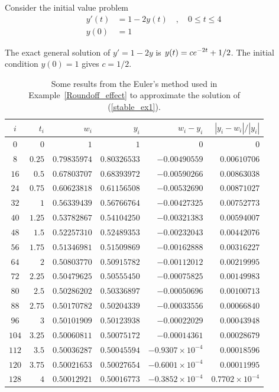 \begin{egg}
Consider the initial value problem
\begin{equation} \label{stable_ex1}
\begin{split}
y'(t) &= 1 -2y(t) \quad , \quad 0\leq t \leq 4 \\
y(0) &= 1
\end{split}
\end{equation}

The exact general solution of $y'= 1-2y$ is
$\displaystyle y(t) = c e^{-2t} +1/2$.
The initial condition $y(0)=1$ gives $c = 1/2$.

\begin{table}
\begin{center}
{\small
\begin{tabular}{crrrrr}
$i$ & $t_i$ & $w_i$ & $y_i$ & $w_i-y_i$ & $|y_i-w_i|/|y_i|$ \\
\hline
$0$ & $0$ & $1$ & $1$ & $0$ & $0$ \\
$8$ & $0.25$ & $0.79835974$ & $0.80326533$ & $-0.00490559$ & $0.00610706$\\
$16$ & $0.5$ & $0.67803707$ & $0.68393972$ & $-0.00590266$ & $0.00863038$ \\
$24$ & $0.75$ & $0.60623818$ & $0.61156508$ & $-0.00532690$ & $0.00871027$ \\
$32$ & $1$ & $0.56339439$ & $0.56766764$ & $-0.00427325$ & $0.00752773$ \\
$40$ & $1.25$ & $0.53782867$ & $0.54104250$ & $-0.00321383$ & $0.00594007$ \\
$48$ & $1.5$ & $0.52257310$ & $0.52489353$ & $-0.00232043$ & $0.00442076$ \\
$56$ & $1.75$ & $0.51346981$ & $0.51509869$ & $-0.00162888$ & $0.00316227$ \\
$64$ & $2$ & $0.50803770$ & $0.50915782$ & $-0.00112012$ & $0.00219995$ \\
$72$ & $2.25$ & $0.50479625$ & $0.50555450$ & $-0.00075825$ & $0.00149983$ \\
$80$ & $2.5$ & $0.50286202$ & $0.50336897$ & $-0.00050696$ & $0.00100713$ \\
$88$ & $2.75$ & $0.50170782$ & $0.50204339$ & $-0.00033556$ & $0.00066840$ \\
$96$ & $3$ & $0.50101909$ & $0.50123938$ & $-0.00022029$ & $0.00043948$ \\
$104$ & $3.25$ & $0.50060811$ & $0.50075172$ & $-0.00014361$ & $0.00028679$ \\
$112$ & $3.5$ & $0.50036287$ & $0.50045594$ & $-0.9307\times 10^{-4}$ &
$0.00018596$ \\
$120$ & $3.75$ & $0.50021653$ & $0.50027654$ & $-0.6001 \times 10^{-4}$ &
$0.00011995$ \\
$128$ & $4$ & $0.50012921$ & $0.50016773$ & $-0.3852 \times 10^{-4}$ &
$0.7702 \times 10^{-4}$ \\
\hline
\end{tabular}
}
\end{center}
\caption[Example for the Euler's method]{Some results from
the Euler's method used in Example~\ref{Roundoff_effect} to approximate
the solution of (\ref{stable_ex1}).\label{STAB_EM}}
\end{table}


\end{egg}
